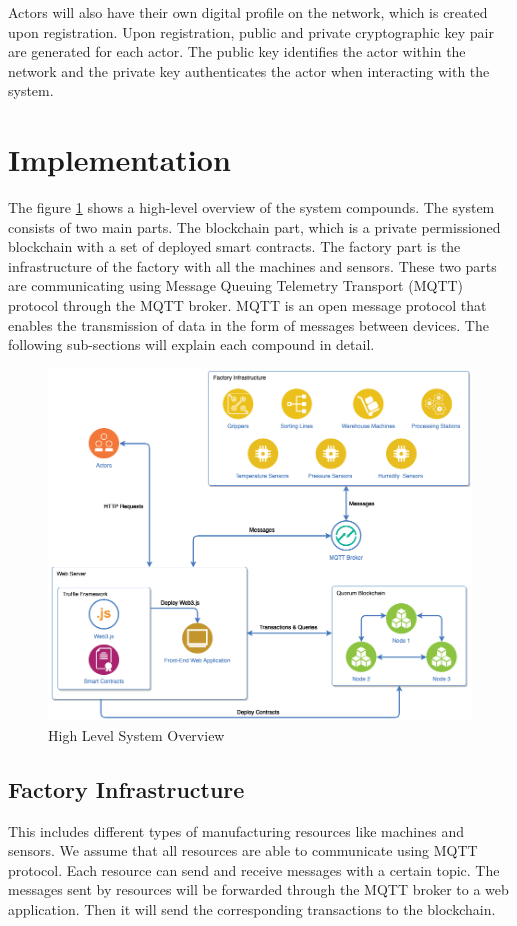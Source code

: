 \documentclass[runningheads]{llncs}
\begin{document}
\noindent Actors will also have their own digital profile on the network, which is created upon registration. Upon registration,  public and private cryptographic key pair are generated for each actor. The public key identifies the actor within the network and the private key authenticates the actor when interacting with the system.

\newpage

\section{Implementation}
The figure \ref{fig:system_overview} shows a high-level overview of the system compounds. The system consists of two main parts. The blockchain part, which is a private permissioned blockchain with a set of deployed smart contracts. The factory part is the infrastructure of the factory with all the machines and sensors. These two parts are communicating using Message Queuing Telemetry Transport (MQTT) protocol through the MQTT broker. MQTT is an open message protocol that enables the transmission of data in the form of messages between devices. The following sub-sections will explain each compound in detail.

\begin{figure}
\centering
\includegraphics[width=1\textwidth]{figures/system_overview_2.png}
\caption{High Level System Overview}
\label{fig:system_overview}
\end{figure}

\subsection{Factory Infrastructure}
This includes different types of manufacturing resources like machines and sensors. We assume that all resources are able to communicate using MQTT protocol. Each resource can send and receive messages with a certain topic. The messages sent by resources will be forwarded through the MQTT broker to a web application. Then it will send the corresponding transactions to the blockchain.
\end{document}
